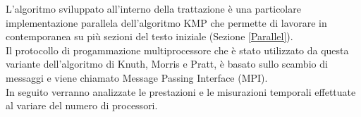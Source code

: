 L'algoritmo sviluppato all'interno della trattazione è una particolare implementazione parallela dell'algoritmo KMP che permette di lavorare in contemporanea su più sezioni del testo iniziale (Sezione \ref{Parallel}). \\ Il protocollo di progammazione multiprocessore che è stato utilizzato da questa variante dell'algoritmo di Knuth, Morris e Pratt,  è basato sullo scambio di messaggi e viene chiamato Message Passing Interface (MPI).\\
In seguito verranno analizzate le prestazioni e le misurazioni temporali effettuate al variare del numero di processori.\\